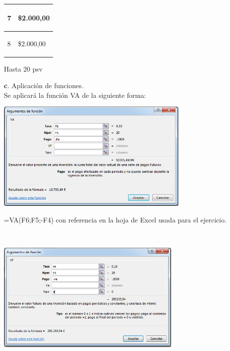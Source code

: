 \begin{spacing}{0.1}
\begin{center}
\begin{tabular}{ |p{3.5cm}| p{3cm}|}
\begin{center}7 \end{center}    & \begin{center} \$2.000,00 \end{center}  \\ \hline

\begin{center}8 \end{center}    & \begin{center} \$2.000,00 \end{center}  \\ \hline
\end{tabular}

\end{center}
\end{spacing}

\begin{center} Hasta 20 psv \end{center}

\textbf{c}. Aplicación de funciones.
 \\
 
Se aplicará la función VA de la siguiente forma:     
 
 \begin{center}
	\includegraphics[height=5.4cm]{img/ch8/8_7.png}
\end{center}

\clearpage

=VA(F6;F5;-F4) con referencia en la hoja de Excel usada para el ejercicio.

\\
 \begin{center}
	\includegraphics[height=5.4cm]{img/ch8/8_8.png}
\end{center}

